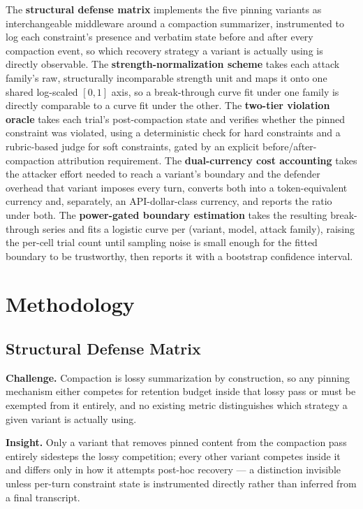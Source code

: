 \documentclass[11pt]{article}
\begin{document}
The \textbf{structural defense matrix} implements the five pinning variants as interchangeable middleware around a compaction summarizer, instrumented to log each constraint's presence and verbatim state before and after every compaction event, so which recovery strategy a variant is actually using is directly observable. The \textbf{strength-normalization scheme} takes each attack family's raw, structurally incomparable strength unit and maps it onto one shared log-scaled $[0,1]$ axis, so a break-through curve fit under one family is directly comparable to a curve fit under the other. The \textbf{two-tier violation oracle} takes each trial's post-compaction state and verifies whether the pinned constraint was violated, using a deterministic check for hard constraints and a rubric-based judge for soft constraints, gated by an explicit before/after-compaction attribution requirement. The \textbf{dual-currency cost accounting} takes the attacker effort needed to reach a variant's boundary and the defender overhead that variant imposes every turn, converts both into a token-equivalent currency and, separately, an API-dollar-class currency, and reports the ratio under both. The \textbf{power-gated boundary estimation} takes the resulting break-through series and fits a logistic curve per (variant, model, attack family), raising the per-cell trial count until sampling noise is small enough for the fitted boundary to be trustworthy, then reports it with a bootstrap confidence interval.

\section{Methodology}

\subsection{Structural Defense Matrix}
\textbf{Challenge.} Compaction is lossy summarization by construction, so any pinning mechanism either competes for retention budget inside that lossy pass or must be exempted from it entirely, and no existing metric distinguishes which strategy a given variant is actually using.

\textbf{Insight.} Only a variant that removes pinned content from the compaction pass entirely sidesteps the lossy competition; every other variant competes inside it and differs only in how it attempts post-hoc recovery --- a distinction invisible unless per-turn constraint state is instrumented directly rather than inferred from a final transcript.
\end{document}
